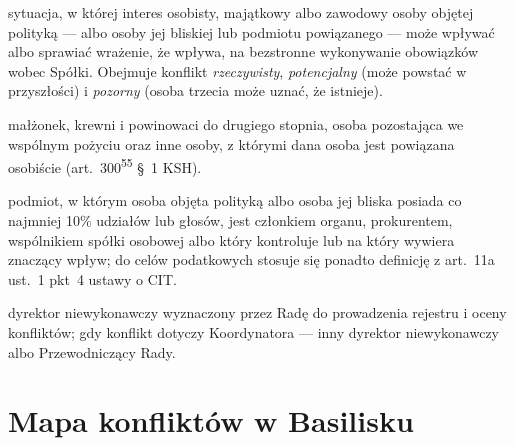 \documentclass[11pt,a4paper]{report}
\begin{document}
\begin{description}[leftmargin=1em, style=nextline]
  \item[Konflikt interesów] sytuacja, w której interes osobisty, majątkowy albo zawodowy osoby objętej polityką --- albo osoby jej bliskiej lub podmiotu powiązanego --- może wpływać albo sprawiać wrażenie, że wpływa, na bezstronne wykonywanie obowiązków wobec Spółki. Obejmuje konflikt \emph{rzeczywisty}, \emph{potencjalny} (może powstać w przyszłości) i \emph{pozorny} (osoba trzecia może uznać, że istnieje).
  \item[Osoba bliska] małżonek, krewni i powinowaci do drugiego stopnia, osoba pozostająca we wspólnym pożyciu oraz inne osoby, z którymi dana osoba jest powiązana osobiście (art.~300\textsuperscript{55} §~1 KSH).
  \item[Podmiot powiązany] podmiot, w którym osoba objęta polityką albo osoba jej bliska posiada co najmniej 10\% udziałów lub głosów, jest członkiem organu, prokurentem, wspólnikiem spółki osobowej albo który kontroluje lub na który wywiera znaczący wpływ; do celów podatkowych stosuje się ponadto definicję z art.~11a ust.~1 pkt~4 ustawy o CIT.
  \item[Koordynator] dyrektor niewykonawczy wyznaczony przez Radę do prowadzenia rejestru i oceny konfliktów; gdy konflikt dotyczy Koordynatora --- inny dyrektor niewykonawczy albo Przewodniczący Rady.
\end{description}

\section{Mapa konfliktów w Basilisku}
\end{document}
